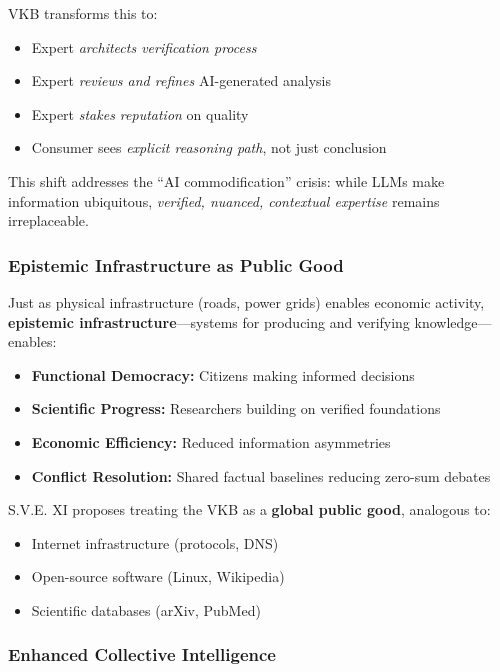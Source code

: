 \documentclass[11pt,a4paper]{article}
\theoremstyle{definition}
\theoremstyle{remark}
\newcommand{\VKB}{\textsc{VKB}}
\begin{document}
\VKB{} transforms this to:
\begin{itemize}
    \item Expert \textit{architects verification process}
    \item Expert \textit{reviews and refines} AI-generated analysis
    \item Expert \textit{stakes reputation} on quality
    \item Consumer sees \textit{explicit reasoning path}, not just conclusion
\end{itemize}

This shift addresses the ``AI commodification'' crisis: while LLMs make information ubiquitous, \textit{verified, nuanced, contextual expertise} remains irreplaceable.

\subsubsection{Epistemic Infrastructure as Public Good}

Just as physical infrastructure (roads, power grids) enables economic activity, \textbf{epistemic infrastructure}—systems for producing and verifying knowledge—enables:
\begin{itemize}
    \item \textbf{Functional Democracy:} Citizens making informed decisions
    \item \textbf{Scientific Progress:} Researchers building on verified foundations
    \item \textbf{Economic Efficiency:} Reduced information asymmetries
    \item \textbf{Conflict Resolution:} Shared factual baselines reducing zero-sum debates
\end{itemize}

S.V.E. XI proposes treating the \VKB{} as a \textbf{global public good}, analogous to:
\begin{itemize}
    \item Internet infrastructure (protocols, DNS)
    \item Open-source software (Linux, Wikipedia)
    \item Scientific databases (arXiv, PubMed)
\end{itemize}

\subsubsection{Enhanced Collective Intelligence}
\end{document}
